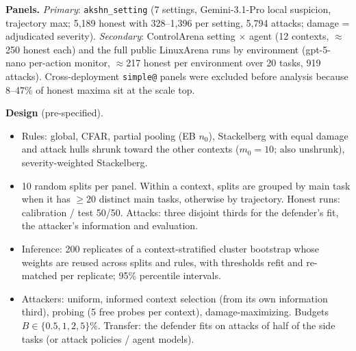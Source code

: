 \documentclass[11pt]{article}
\begin{document}
\textbf{Panels.} \emph{Primary}: \texttt{akshn\_setting} (7 settings, Gemini-3.1-Pro local suspicion, trajectory max; 5{,}189 honest with 328--1{,}396 per setting, 5{,}794 attacks; damage = adjudicated severity). \emph{Secondary}: ControlArena setting $\times$ agent (12 contexts, $\approx$250 honest each) and the full public LinuxArena runs by environment (gpt-5-nano per-action monitor, $\approx$217 honest per environment over 20 tasks, 919 attacks). Cross-deployment \texttt{simple@} panels were excluded before analysis because 8--47\% of honest maxima sit at the scale top.

\textbf{Design} (pre-specified).
\begin{itemize}
\item Rules: global, CFAR, partial pooling (EB $n_0$), Stackelberg with equal damage and attack hulls shrunk toward the other contexts ($m_0=10$; also unshrunk), severity-weighted Stackelberg.
\item 10 random splits per panel. Within a context, splits are grouped by main task when it has $\ge20$ distinct main tasks, otherwise by trajectory. Honest runs: calibration / test 50/50. Attacks: three disjoint thirds for the defender's fit, the attacker's information and evaluation.
\item Inference: 200 replicates of a context-stratified cluster bootstrap whose weights are reused across splits and rules, with thresholds refit and re-matched per replicate; 95\% percentile intervals.
\item Attackers: uniform, informed context selection (from its own information third), probing (5 free probes per context), damage-maximizing. Budgets $B\in\{0.5,1,2,5\}\%$. Transfer: the defender fits on attacks of half of the side tasks (or attack policies / agent models).
\end{itemize}
\end{document}

